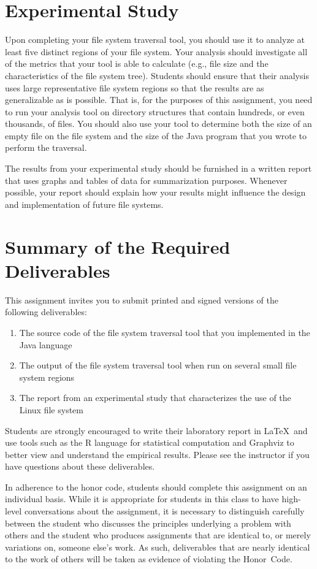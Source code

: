 \section*{Experimental Study}

Upon completing your file system traversal tool, you should use it to analyze at least five distinct regions of your file system.
Your analysis should investigate all of the metrics that your tool is able to calculate (e.g., file size and the characteristics
of the file system tree). Students should ensure that their analysis uses large representative file system regions so that the
results are as generalizable as is possible. That is, for the purposes of this assignment, you need to run your analysis tool on
directory structures that contain hundreds, or even thousands, of files. You should also use your tool to determine both the size
of an empty file on the file system and the size of the Java program that you wrote to perform the traversal.

The results from your experimental study should be furnished in a written report that uses graphs and tables of data for
summarization purposes. Whenever possible, your report should explain how your results might influence the design and
implementation of future file systems.

\section*{Summary of the Required Deliverables}

This assignment invites you to submit printed and signed versions of the following deliverables: 

  \begin{enumerate}
    \item The source code of the file system traversal tool that you implemented in the Java language
    \item The output of the file system traversal tool when run on several small file system regions
    \item The report from an experimental study that characterizes the use of the Linux file system
  \end{enumerate}

Students are strongly encouraged to write their laboratory report in \LaTeX~and use tools such as the R language for statistical
computation and Graphviz to better view and understand the empirical results. Please see the instructor if you have questions
about these deliverables.

In adherence to the honor code, students should complete this assignment on an individual basis. While it is appropriate for
students in this class to have high-level conversations about the assignment, it is necessary to distinguish carefully between the
student who discusses the principles underlying a problem with others and the student who produces assignments that are identical
to, or merely variations on, someone else's work.  As such, deliverables that are nearly identical to the work of others will be
taken as evidence of violating the \mbox{Honor Code}.  



  
